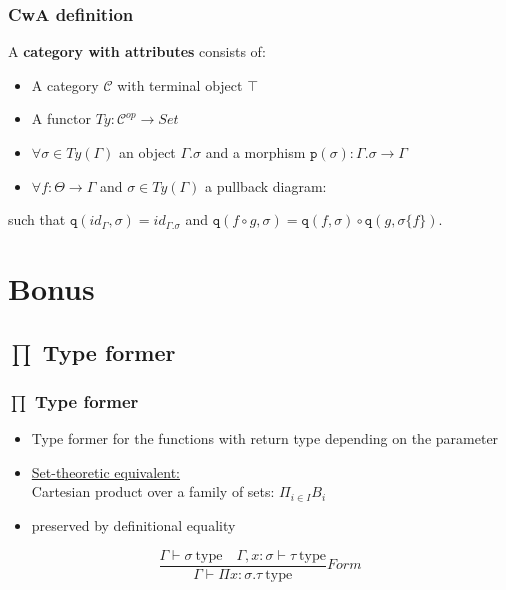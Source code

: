 \documentclass[aspectratio=169]{beamer}
\newcommand{\typ}{\ \mathrm{type}}
\newcommand{\F}{Form}
\newcommand{\cate}{\mathcal{C}}
\newcommand{\pp}{\texttt{p}}
\newcommand{\qq}{\texttt{q}}
\newcommand{\extension}{\Gamma.\sigma}
\begin{document}
    \begin{frame}
        \frametitle{CwA definition}
        A \textbf{category with attributes} consists of:
        \begin{itemize}
            \item A category $\cate$ with terminal object $\top$
            \item A functor $Ty:\cate^{op}\to Set$
            \item $\forall \sigma \in Ty(\Gamma)$ an object $\extension$ and a morphism $\pp(\sigma):\extension\to\Gamma$
            \item $\forall f: \Theta\to\Gamma$ and $\sigma\in Ty(\Gamma)$ a pullback diagram:
        \end{itemize}
        \begin{center}
        \end{center}

        such that $\qq(id_\Gamma,\sigma) = id_{\Gamma.\sigma}$ and $\qq(f\circ g,\sigma) = \qq(f,\sigma)\circ\qq(g,\sigma\{f\})$.
    \end{frame}

    \section{Bonus}

    \subsection{$\prod$ Type former}
    \begin{frame}
        \frametitle{$\prod$ Type former}
        \begin{itemize}
            \item Type former for the functions with return type depending on the parameter
            \item \underline{Set-theoretic equivalent:}\\
            Cartesian product over a family of sets: $\Pi_{i\in I}B_i$
            \item preserved by definitional equality
        \end{itemize}
        \vspace{40pt}
        $$\frac{\Gamma \vdash \sigma \typ \quad \Gamma,x:\sigma\vdash \tau \typ}{\Gamma \vdash \Pi x:\sigma.\tau \typ}\F$$
    \end{frame}
\end{document}
